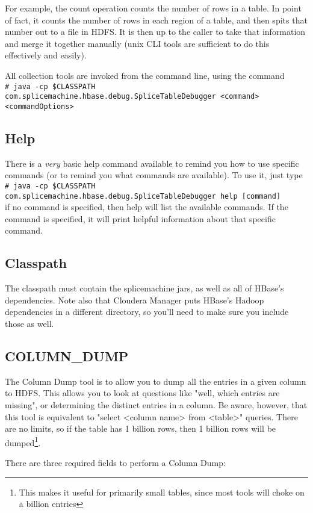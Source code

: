 \documentclass[10pt]{article}
\newcommand{\shellcmd}[1]{\\\indent\indent\texttt{\footnotesize\# #1}\\}
\begin{document}
For example, the count operation counts the number of rows in a table. In point of fact, it counts the number of rows in each region of a table, and then spits that
number out to a file in HDFS. It is then up to the caller to take that information and merge it together manually (unix CLI tools are sufficient to do this effectively
and easily).

All collection tools are invoked from the command line, using the command 
\shellcmd{java -cp \$CLASSPATH com.splicemachine.hbase.debug.SpliceTableDebugger <command> <commandOptions>}

\subsection{Help}
There is a \emph{very} basic help command available to remind you how to use specific commands (or to remind you what commands are available). To use it, just type
\shellcmd{java -cp \$CLASSPATH com.splicemachine.hbase.debug.SpliceTableDebugger help [command]}

if no command is specified, then help will list the available commands. If the command is specified, it will print helpful information about that specific
command.

\subsection{Classpath}
The classpath must contain the splicemachine jars, as well as all of HBase's dependencies. Note also that Cloudera Manager puts HBase's Hadoop dependencies in a different directory, so you'll need to make sure you include those as well.

\subsection{COLUMN\_DUMP}
The Column Dump tool is to allow you to dump all the entries in a given column to HDFS. This allows you to look at questions like "well, which entries are missing",
or determining the distinct entries in a column. Be aware, however, that this tool is equivalent to "select <column name> from <table>" queries. There are no limits,
so if the table has 1 billion rows, then 1 billion rows will be dumped\footnote{This makes it useful for primarily small tables, since most tools will choke
on a billion entries}.

There are three required fields to perform a Column Dump:
\end{document}
